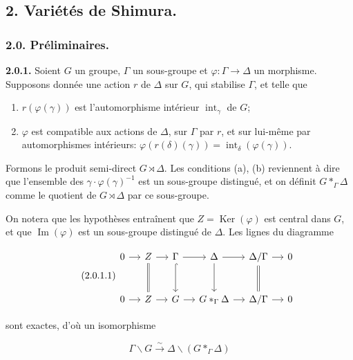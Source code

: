 \documentclass[10pt,a4paper]{article}
\begin{document}
\subsection{2. Variétés de Shimura.}

\subsubsection{2.0. Préliminaires.}

\textbf{2.0.1.} Soient \(G\) un groupe, \(\Gamma\) un sous-groupe et \(\varphi:\Gamma\to\Delta\) un morphisme. Supposons donnée une action \(r\) de \(\Delta\) sur \(G\), qui stabilise \(\Gamma\), et telle que

\begin{enumerate}
\def\labelenumi{(\alph{enumi})}
\item
  \(r(\varphi(\gamma))\) est l'automorphisme intérieur \(\operatorname{int}_\gamma\) de \(G\);
\item
  \(\varphi\) est compatible aux actions de \(\Delta\), sur \(\Gamma\) par \(r\), et sur lui-même par automorphismes intérieurs: \(\varphi(r(\delta)(\gamma))=\operatorname{int}_\delta(\varphi(\gamma))\).
\end{enumerate}

Formons le produit semi-direct \(G\rtimes\Delta\). Les conditions (a), (b) reviennent à dire que l'ensemble des \(\gamma\cdot\varphi(\gamma)^{-1}\) est un sous-groupe distingué, et on définit \(G*_{\Gamma}\Delta\) comme le quotient de \(G\rtimes\Delta\) par ce sous-groupe.

On notera que les hypothèses entraînent que \(Z=\operatorname{Ker}(\varphi)\) est central dans \(G\), et que \(\operatorname{Im}(\varphi)\) est un sous-groupe distingué de \(\Delta\). Les lignes du diagramme

\begin{equation}
\tag{2.0.1.1}
\begin{tikzcd}[column sep=small,row sep=large]
0 \arrow[r] & Z \arrow[r] \arrow[d,equal] & \Gamma \arrow[r] \arrow[d,hook] & \Delta \arrow[r] \arrow[d] & \Delta/\Gamma \arrow[r] \arrow[d,equal] & 0 \\
0 \arrow[r] & Z \arrow[r] & G \arrow[r] & G*_{\Gamma}\Delta \arrow[r] & \Delta/\Gamma \arrow[r] & 0
\end{tikzcd}
\end{equation}

sont exactes, d'où un isomorphisme

\[
\Gamma\backslash G\xrightarrow{\sim}\Delta\backslash(G*_{\Gamma}\Delta) \tag{2.0.1.2}
\]
\end{document}

